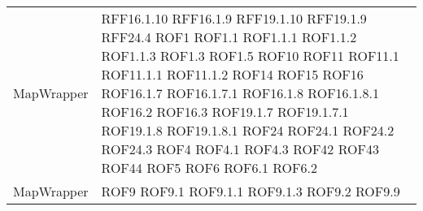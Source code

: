 \begin{longtable}{p{5cm}!{\VRule[1pt]}p{2.5cm}}
		MapWrapper & RFF16.1.10 \newline RFF16.1.9 \newline RFF19.1.10 \newline RFF19.1.9 \newline RFF24.4 \newline ROF1 \newline ROF1.1 \newline ROF1.1.1 \newline ROF1.1.2 \newline ROF1.1.3 \newline ROF1.3 \newline ROF1.5 \newline ROF10 \newline ROF11 \newline ROF11.1 \newline ROF11.1.1 \newline ROF11.1.2 \newline ROF14 \newline ROF15 \newline ROF16 \newline ROF16.1.7 \newline ROF16.1.7.1 \newline ROF16.1.8 \newline ROF16.1.8.1 \newline ROF16.2 \newline ROF16.3 \newline ROF19.1.7 \newline ROF19.1.7.1 \newline ROF19.1.8 \newline ROF19.1.8.1 \newline ROF24 \newline ROF24.1 \newline ROF24.2 \newline ROF24.3 \newline ROF4 \newline ROF4.1 \newline ROF4.3 \newline ROF42 \newline ROF43 \newline ROF44 \newline ROF5 \newline ROF6 \newline ROF6.1 \newline ROF6.2 \\
		MapWrapper & ROF9 \newline ROF9.1 \newline ROF9.1.1 \newline ROF9.1.3 \newline ROF9.2 \newline ROF9.9\\

\end{longtable}
